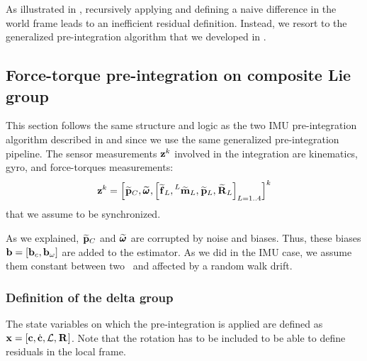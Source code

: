 As illustrated in , recursively applying  and defining a naive difference in the world frame leads to an inefficient
residual definition. Instead, we resort to the generalized pre-integration algorithm that we developed in .






\subsection{Force-torque pre-integration on composite Lie group}

This section follows the same structure and logic as the two IMU pre-integration algorithm described in  and  since
we use the same generalized pre-integration pipeline. 
The sensor measurements ${\bf z}^k$ involved in the integration are kinematics, gyro, and force-torques  measurements:
%
\begin{equation}
    {\bf z}^k = \left[ \prescript{}{}{\widetilde{{\bf p}}}_{C}, \prescript{}{}{\widetilde{\pmb{\omega}}}_{}, \left[\prescript{}{}{\widetilde{{\bf f}}}_{L}, \prescript{L}{}{\widetilde{\bf m}}_{L}, \prescript{}{}{\widetilde{{\bf p}}}_{L}, \prescript{}{}{\widetilde{{\bf R}}}_{L} \right]_{L=1..4}\right]^k
\end{equation}
%
that we assume to be synchronized.

As we explained, $\prescript{}{}{\widetilde{{\bf p}}}_{C}$ and $\prescript{}{}{\widetilde{\pmb{\omega}}}_{}$ are corrupted by noise and biases. Thus, these biases  ${\bf b} = [{\bf b}_c, {\bf b}_{\omega}]$ are added to the estimator.
As we did in the IMU case, we assume them constant between two \keyframes\ and affected by a random walk drift.


\subsubsection{Definition of the delta group}

The state variables on which the pre-integration is applied are defined as ${\bf x}=[{\bf c}, \dot{{\bf c}}, \mathcal{L}, \prescript{}{}{{\bf R}}_{}]$.
Note that the rotation has to be included to be able to define residuals in the local frame.

